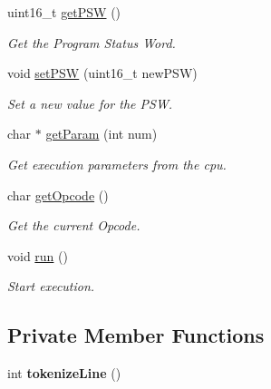 \begin{DoxyCompactItemize}
uint16\-\_\-t \hyperlink{classcCPU_ad485374a709476e2dfb847046d3d5215}{get\-P\-S\-W} ()
\begin{DoxyCompactList}\small\item\em \-Get the \-Program \-Status \-Word. \end{DoxyCompactList}\item 
void \hyperlink{classcCPU_adb6ad793398d28b5615dd1377a619084}{set\-P\-S\-W} (uint16\-\_\-t new\-P\-S\-W)
\begin{DoxyCompactList}\small\item\em \-Set a new value for the \-P\-S\-W. \end{DoxyCompactList}\item 
char $\ast$ \hyperlink{classcCPU_a891d9b77e1818ca247e9d76f4db99415}{get\-Param} (int num)
\begin{DoxyCompactList}\small\item\em \-Get execution parameters from the cpu. \end{DoxyCompactList}\item 
char \hyperlink{classcCPU_a987e1ab511c71dcde48411f5bb16f9d8}{get\-Opcode} ()
\begin{DoxyCompactList}\small\item\em \-Get the current \-Opcode. \end{DoxyCompactList}\item 
void \hyperlink{classcCPU_aee300d68026ba9f13d5434ff82f0372a}{run} ()
\begin{DoxyCompactList}\small\item\em \-Start execution. \end{DoxyCompactList}\end{DoxyCompactItemize}
\subsection*{\-Private \-Member \-Functions}
\begin{DoxyCompactItemize}
\item 
\hypertarget{classcCPU_a62812ecc1a65c296fb4795b24b451f4e}{int {\bfseries tokenize\-Line} ()}\label{d2/dc6/classcCPU_a62812ecc1a65c296fb4795b24b451f4e}

\end{DoxyCompactItemize}
